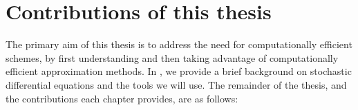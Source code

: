 



\section{Contributions of this thesis}
The primary aim of this thesis is to address the need for computationally efficient schemes, by first understanding and then taking advantage of computationally efficient approximation methods.
In , we provide a brief background on stochastic differential equations and the tools we will use.
The remainder of the thesis, and the contributions each chapter provides, are as follows:
